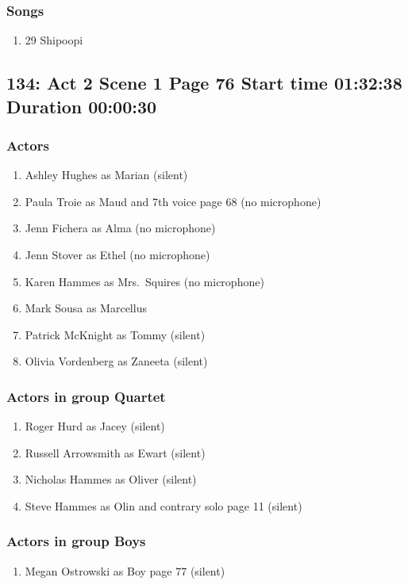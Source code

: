 \subsubsection{Songs}
\begin{enumerate}
\item 29 Shipoopi
\end{enumerate}
\subsection{134: Act 2 Scene 1 Page 76 Start time 01:32:38 Duration 00:00:30}

\subsubsection{Actors}
\begin{enumerate}
\item Ashley Hughes as Marian (silent)
\item Paula Troie as Maud and 7th voice page 68 (no microphone)
\item Jenn Fichera as Alma (no microphone)
\item Jenn Stover as Ethel (no microphone)
\item Karen Hammes as Mrs.~Squires (no microphone)
\item Mark Sousa as Marcellus
\item Patrick McKnight as Tommy (silent)
\item Olivia Vordenberg as Zaneeta (silent)
\end{enumerate}
\subsubsection{Actors in group Quartet}
\begin{enumerate}
\item Roger Hurd as Jacey (silent)
\item Russell Arrowsmith as Ewart (silent)
\item Nicholas Hammes as Oliver (silent)
\item Steve Hammes as Olin and contrary solo page 11 (silent)
\end{enumerate}
\subsubsection{Actors in group Boys}
\begin{enumerate}
\item Megan Ostrowski as Boy page 77 (silent)
\end{enumerate}

